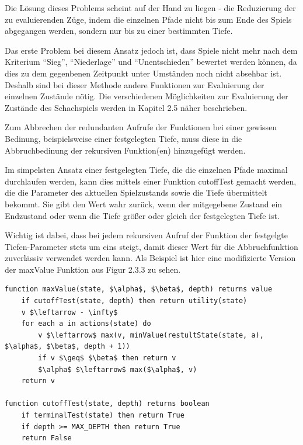 
Die Lösung dieses Problems scheint auf der Hand zu liegen - die Reduzierung der zu evaluierenden Züge, indem die einzelnen Pfade nicht bis zum Ende des Spiels abgegangen werden, sondern nur bis zu einer bestimmten Tiefe.

Das erste Problem bei diesem Ansatz jedoch ist, dass Spiele nicht mehr nach dem Kriterium ``Sieg'', ``Niederlage'' und ``Unentschieden'' bewertet werden können, da dies zu dem gegenbenen Zeitpunkt unter Umständen noch nicht absehbar ist. Deshalb sind bei dieser Methode andere Funktionen zur Evaluierung der einzelnen Zustände nötig. Die verschiedenen Möglichkeiten zur Evaluierung der Zustände des Schachspiels werden in Kapitel 2.5 näher beschrieben.

Zum Abbrechen der redundanten Aufrufe der Funktionen bei einer gewissen Bedinung, beispielsweise einer festgelegten Tiefe, muss diese in die Abbruchbedinung der rekursiven Funktion(en) hinzugefügt werden.

Im simpelsten Ansatz einer festgelegten Tiefe, die die einzelnen Pfade maximal durchlaufen werden, kann dies mittels einer Funktion cutoffTest gemacht werden, die die Parameter des aktuellen Spielzustands sowie die Tiefe übermittelt bekommt. Sie gibt den Wert wahr zurück, wenn der mitgegebene Zustand ein Endzustand oder wenn die Tiefe größer oder gleich der festgelegten Tiefe ist.

Wichtig ist dabei, dass bei jedem rekursiven Aufruf der Funktion der festgelgte Tiefen-Parameter stets um eins steigt, damit dieser Wert für die Abbruchfunktion zuverlässiv verwendet werden kann. Als Beispiel ist hier eine modifizierte Version der maxValue Funktion aus Figur 2.3.3 zu sehen.

\begin{lstlisting}
function maxValue(state, $\alpha$, $\beta$, depth) returns value
	if cutoffTest(state, depth) then return utility(state)
	v $\leftarrow - \infty$
	for each a in actions(state) do
		v $\leftarrow$ max(v, minValue(restultState(state, a), $\alpha$, $\beta$, depth + 1))
		if v $\geq$ $\beta$ then return v
		$\alpha$ $\leftarrow$ max($\alpha$, v)
	return v
	
function cutoffTest(state, depth) returns boolean
	if terminalTest(state) then return True
	if depth >= MAX_DEPTH then return True
	return False
\end{lstlisting}

